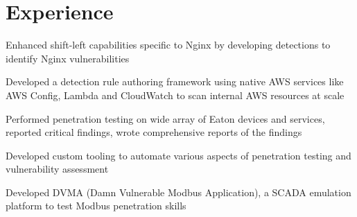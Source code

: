 \documentclass[letterpaper]{deedy-resume} %
\begin{document}
\begin{minipage}[t]{0.66\textwidth} %


\section{Experience}


\vspace{\topsep} %
\begin{tightitemize}
\item  Enhanced shift-left capabilities specific to Nginx by developing detections to identify Nginx vulnerabilities
\item  Developed a detection rule authoring framework using native AWS services like AWS Config, Lambda and CloudWatch to scan internal AWS resources at scale
\end{tightitemize}

\sectionspace %


\begin{tightitemize}
\item  Performed penetration testing on wide array of Eaton devices and services, reported critical findings, wrote comprehensive reports of the findings
\item  Developed custom tooling to automate various aspects of penetration testing and vulnerability assessment
\item  Developed DVMA (Damn Vulnerable Modbus Application), a SCADA emulation platform to test Modbus penetration skills
\end{tightitemize}

\sectionspace %


\end{minipage}
\end{document}

